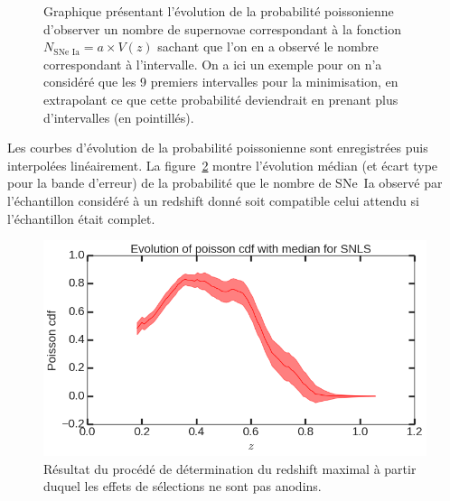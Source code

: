 \documentclass[a4paper, 12pt, svgnames]{article}
\begin{document}
\begin{figure}[htbp!]
    \centering
    \captionsetup{justification=centering}
    \caption{Graphique présentant l'évolution de la probabilité poissonienne
        d'observer un nombre de supernovae correspondant à la fonction
        $N_{\text{SNe~Ia}} = a\times V(z)$ sachant que l'on en a observé le
        nombre correspondant à l'intervalle. On a ici un exemple pour on n'a
        considéré que les 9 premiers intervalles pour la minimisation, en
        extrapolant ce que cette probabilité deviendrait en prenant plus
        d'intervalles (en pointillés).}
    \label{fig:zmax_method}
\end{figure}

Les courbes d'évolution de la probabilité poissonienne sont enregistrées puis
interpolées linéairement. La figure~\ref{fig:zmax_result} montre l'évolution
médian (et écart type pour la bande d'erreur) de la probabilité que le nombre de
SNe~Ia observé par l'échantillon considéré à un redshift donné soit compatible
celui attendu si l'échantillon était complet.

\begin{figure}[htbp!]
    \centering
    \includegraphics[width=.5\linewidth]{Rapport_figures/zmax_result.png}
    \captionsetup{justification=centering}
    \caption{Résultat du procédé de détermination du redshift maximal à partir
    duquel les effets de sélections ne sont pas anodins.}
    \label{fig:zmax_result}
\end{figure}
\end{document}
